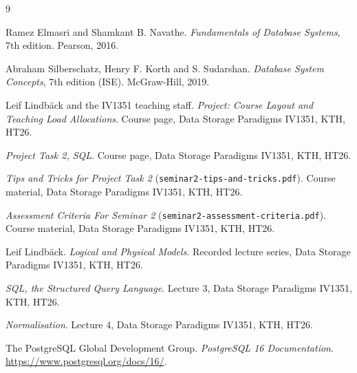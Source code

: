 \documentclass[a4paper]{scrartcl}
\renewcommand{\_}{\textunderscore\allowbreak}
\begin{document}
\renewcommand{\refname}{}
\vspace{-2\baselineskip}
\begin{thebibliography}{9}

Ramez Elmasri and Shamkant B. Navathe.
\textit{Fundamentals of Database Systems}, 7th edition.
Pearson, 2016.

Abraham Silberschatz, Henry F. Korth and S. Sudarshan.
\textit{Database System Concepts}, 7th edition (ISE).
McGraw-Hill, 2019.

Leif Lindbäck and the IV1351 teaching staff.
\textit{Project: Course Layout and Teaching Load Allocations}.
Course page, Data Storage Paradigms IV1351, KTH, HT26.

\textit{Project Task 2, SQL}.
Course page, Data Storage Paradigms IV1351, KTH, HT26.

\textit{Tips and Tricks for Project Task 2} (\texttt{seminar2-tips-and-tricks.pdf}).
Course material, Data Storage Paradigms IV1351, KTH, HT26.

\textit{Assessment Criteria For Seminar 2} (\texttt{seminar2-assessment-criteria.pdf}).
Course material, Data Storage Paradigms IV1351, KTH, HT26.

Leif Lindbäck.
\textit{Logical and Physical Models}. Recorded lecture series,
Data Storage Paradigms IV1351, KTH, HT26.

\textit{SQL, the Structured Query Language}. Lecture 3, Data Storage Paradigms IV1351, KTH, HT26.

\textit{Normalisation}. Lecture 4, Data Storage Paradigms IV1351, KTH, HT26.

The PostgreSQL Global Development Group.
\textit{PostgreSQL 16 Documentation}.
\url{https://www.postgresql.org/docs/16/}.

\end{thebibliography}
\end{document}
